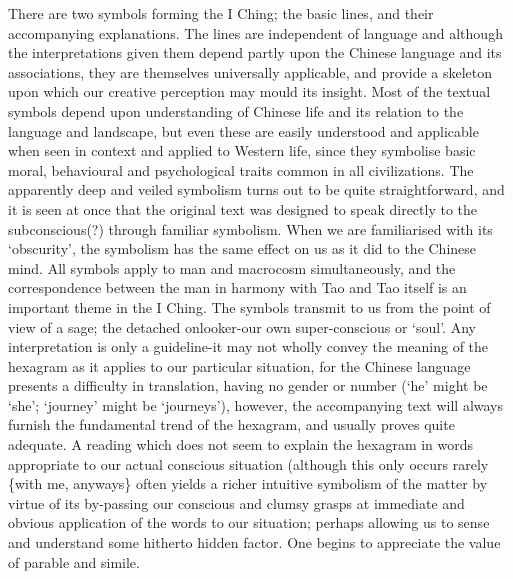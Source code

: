\documentclass[11pt]{book}
\begin{document}
There are two symbols forming the I Ching; the basic lines, and their accompanying explanations. The lines are independent of language and although the interpretations given them depend partly upon the Chinese language and its associations, they are themselves universally applicable, and provide a skeleton upon which our creative perception may mould its insight. Most of the textual symbols depend upon understanding of Chinese life and its relation to the language and landscape, but even these are easily understood and applicable when seen in context and applied to Western life, since they symbolise basic moral, behavioural and psychological traits common in all civilizations. The apparently deep and veiled symbolism turns out to be quite straightforward, and it is seen at once that the original text was designed to speak directly to the subconscious(?) through familiar symbolism. When we are familiarised with its `obscurity', the symbolism has the same effect on us as it did to the Chinese mind. All symbols apply to man and macrocosm simultaneously, and the correspondence between the man in harmony with Tao and Tao itself is an important theme in the I Ching. The symbols transmit to us from the point of view of a sage; the detached onlooker-our own super-conscious or `soul'. Any interpretation is only a guideline-it may not wholly convey the meaning of the hexagram as it applies to our particular situation, for the Chinese language presents a difficulty in translation, having no gender or number (`he' might be `she'; `journey' might be `journeys'), however, the accompanying text will always furnish the fundamental trend of the hexagram, and usually proves quite adequate. A reading which does not seem to explain the hexagram in words appropriate to our actual conscious situation (although this only occurs rarely \{with me, anyways\} often yields a richer intuitive symbolism of the matter by virtue of its by-passing our conscious and clumsy grasps at immediate and obvious application of the words to our situation; perhaps allowing us to sense and understand some hitherto hidden factor. One begins to appreciate the value of parable and simile.
\end{document}
